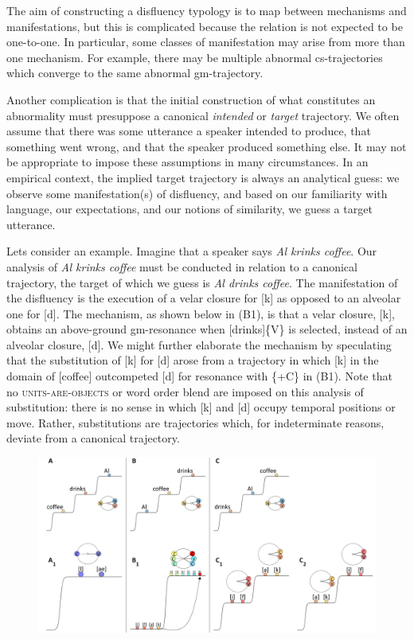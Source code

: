   The aim of constructing a disfluency typology is to map between mechanisms and manifestations, but this is complicated because the relation is not expected to be one-to-one. In particular, some classes of manifestation may arise from more than one mechanism. For example, there may be multiple abnormal cs-trajectories which converge to the same abnormal gm-trajectory. 

  Another complication is that the initial construction of what constitutes an abnormality must presuppose a canonical \textit{intended} or \textit{target} trajectory. We often assume that there was some utterance a speaker intended to produce, that something went wrong, and that the speaker produced something else. It may not be appropriate to impose these assumptions in many circumstances. In an empirical context, the implied target trajectory is always an analytical guess: we observe some manifestation(s) of disfluency, and based on our familiarity with language, our expectations, and our notions of similarity, we guess a target utterance.

  Lets consider an example. Imagine that a speaker says \textit{Al krinks coffee}. Our analysis of \textit{Al krinks coffee} must be conducted in relation to a canonical trajectory, the target of which we guess is \textit{Al drinks coffee}. The manifestation of the disfluency is the execution of a velar closure for [k] as opposed to an alveolar one for [d]. The mechanism, as shown below in (B1), is that a velar closure, [k], obtains an above-ground gm-resonance when [drinks]\{V\} is selected, instead of an alveolar closure, [d]. We might further elaborate the mechanism by speculating that the substitution of [k] for [d] arose from a trajectory in which [k] in the domain of [coffee] outcompeted [d] for resonance with \{+C\} in (B1). Note that no \textsc{units}\textsc{{}-are-}\textsc{objects} or word order blend are imposed on this analysis of substitution: there is no sense in which [k] and [d] occupy temporal positions or move. Rather, substitutions are trajectories which, for indeterminate reasons, deviate from a canonical trajectory. 

  
\begin{figure}
\includegraphics[width=\textwidth]{figures/Tilsen-img58.png}
\caption{\missingcaption}
\label{fig:}
\end{figure}
 

